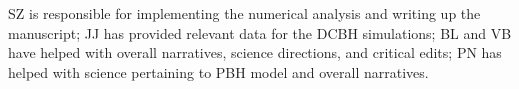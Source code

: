 \documentclass[twocolumn,trackchanges]{aastex701}
\begin{document}
\begin{contribution}

SZ is responsible for implementing the numerical analysis and writing up the manuscript; JJ has provided relevant data for the DCBH simulations; BL and VB have helped with overall narratives, science directions, and critical edits; PN has helped with science pertaining to PBH model and overall narratives.


\end{contribution}

%
\vspace{5mm}


\end{document}
